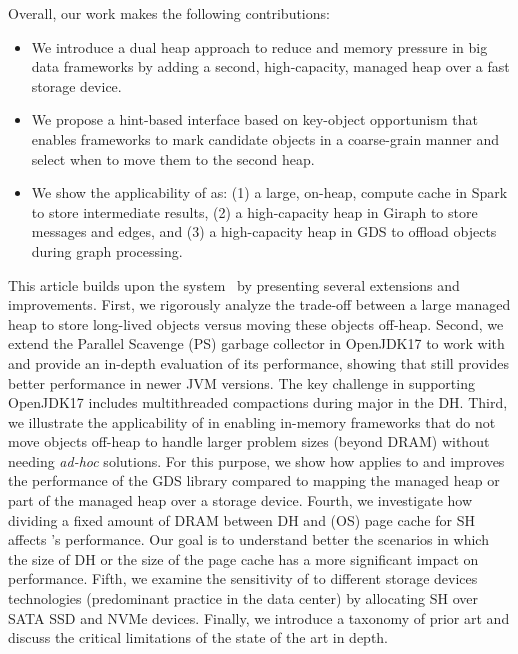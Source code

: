 Overall, our work makes the following contributions:

\begin{itemize}
	\item
	      We introduce a dual heap approach to reduce \teraheapSD and memory pressure in big data frameworks by adding a second, high-capacity, managed heap over a fast storage device.
	\item
	      We propose a hint-based interface based on key-object opportunism that enables frameworks to mark candidate objects in a coarse-grain manner and select when to move them to the second heap.
	\item
	      We show the applicability of \teraheapName{} as: (1) a large, on-heap, compute cache in Spark to store intermediate results, (2) a high-capacity heap in Giraph to store messages and edges, and (3) a high-capacity heap in GDS to offload objects during graph processing.
\end{itemize}

This article builds upon the \teraheapName{} system~\cite{teraheap} by presenting several extensions and improvements.
%
First, we rigorously analyze the trade-off between a large managed heap to store long-lived objects versus moving these objects off-heap.
%
Second, we extend the Parallel Scavenge (PS) garbage collector in OpenJDK17 to work with \teraheapName{} and provide an in-depth evaluation of its performance, showing that \teraheapName{} still provides better performance in newer JVM versions.
The key challenge in supporting OpenJDK17 includes multithreaded compactions during major \teraheapGC{} in the DH.
%
Third, we illustrate the applicability of \teraheapName{} in enabling in-memory frameworks that do not move objects off-heap to handle larger problem sizes (beyond DRAM) without needing \textit{ad-hoc} solutions.
For this purpose, we show how \teraheapName{} applies to and improves the performance of the GDS library compared to mapping the managed heap or part of the managed heap over a storage device.
%
Fourth, we investigate how dividing a fixed amount of DRAM between DH and (OS) page cache for SH affects \teraheapName{}'s performance.
Our goal is to understand better the scenarios in which the size of DH or the size of the page cache has a more significant impact on performance.
%
Fifth, we examine the sensitivity of \teraheapName{} to different storage devices technologies (predominant practice in the data center) by allocating SH over SATA SSD and NVMe devices.
%
Finally, we introduce a taxonomy of prior art and discuss the critical limitations of the state of the art in depth.

